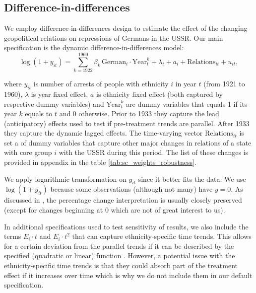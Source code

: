 \subsection{Difference-in-differences} \label{subsec:methodology_did}
We employ difference-in-differences design to estimate the effect of the changing geopolitical relations on repressions of Germans in the USSR. 
Our main specification is the dynamic difference-in-differences model:
\begin{equation}
 \log\left(1 + y_{it}\right) = \sum_{k= 1922}^{1960} \beta_k \, \text{German}_{i} \cdot \text{Year}_{t}^k +  \lambda_t + a_i +  \text{Relations}_{it}   + u_{it},
 \label{eq:dynamic_did}
\end{equation}

where $y_{it}$ is number of arrests of people with ethnicity $i$ in year $t$ (from 1921 to 1960), $\lambda$ is year fixed effect, $a$ is ethnicity fixed effect (both captured by respective dummy variables) and  $\text{Year}_{t}^k$ are dummy variables that equals 1 if its year $k$ equals to $t$ and 0 otherwise.
Prior to  1933 they capture the lead (anticipatory) effects  used to test if pre-treatment trends are parallel. After 1933 they capture the dynamic lagged effects.
The time-varying vector $\text{Relations}_{it}$ is set a of dummy variables that capture other major changes in relations of a state with core group $i$ with the USSR during this period. The list of these changes is provided in appendix in the table \ref{tab:sc_weights_robustness}.

 We apply logarithmic transformation on $y_{it}$ since it better fits the data.  We use $\log\left(1 + y_{it}\right)$ because some observations (although not many) have $y = 0$. As discussed in \citet[p. 193]{wooldridge_introductory_2015},  the percentage change interpretation is usually  closely preserved (except for changes beginning at 0 which are not of great interest to us).   

In additional specifications used to test sensitivity of results, we also include  the terms $ E_i \cdot t$ and $ E_i \cdot t^2$  that can capture  ethnicity-specific time trends. 
This allows for a certain  deviation from the parallel trends if it can be described by the specified (quadratic or linear) function \citep[chapter 5]{angrist_mostly_2009}. 
However, a potential issue with the ethnicity-specific time trends is that they could absorb part of the treatment effect if it increases over time \citep{meer_effects_2016} which is why we do not include them in our default specification. 

